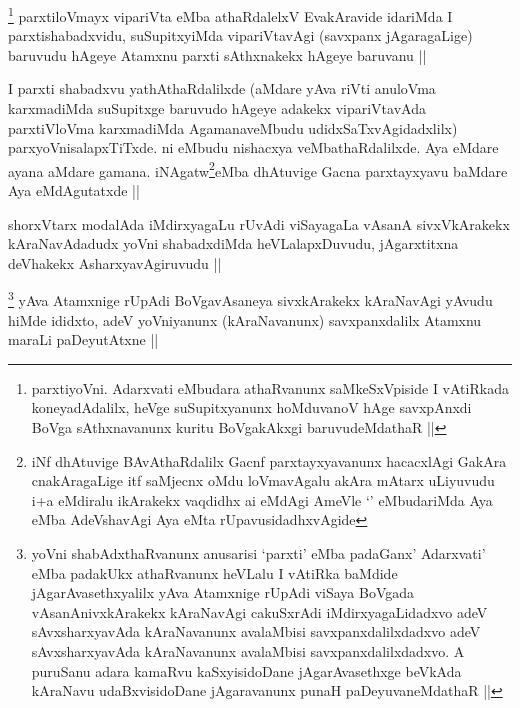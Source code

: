 
\begin{artha}
\footnote{parxtiyoVni. Adarxvati eMbudara athaRvanunx saMkeSxVpiside I vAtiRkada koneyadAdalilx, heVge suSupitxyanunx hoMduvanoV hAge savxpAnxdi BoVga sAthxnavanunx kuritu BoVgakAkxgi baruvudeMdathaR ||}
parxtiloVmayx vipariVta eMba athaRdalelxV EvakAravide idariMda I parxtishabadxvidu, suSupitxyiMda vipariVtavAgi (savxpanx jAgaragaLige) baruvudu hAgeye Atamxnu parxti sAthxnakekx hAgeye baruvanu ||
\end{artha}


\begin{artha}
I parxti shabadxvu yathAthaRdalilxde (aMdare yAva riVti anuloVma karxmadiMda suSupitxge baruvudo hAgeye adakekx vipariVtavAda parxtiVloVma karxmadiMda AgamanaveMbudu udidxSaTxvAgidadxlilx) parxyoVnisalapxTiTxde. ni eMbudu nishacxya veMbathaRdalilxde. Aya eMdare ayana aMdare gamana. iNAgatw\footnote{iNf dhAtuvige BAvAthaRdalilx Gacnf parxtayxyavanunx hacacxlAgi GakAra cnakAragaLige itf saMjecnx oMdu loVmavAgalu akAra mAtarx uLiyuvudu i+a eMdiralu ikArakekx vaqdidhx ai eMdAgi AmeVle `\stext' eMbudariMda Aya eMba AdeVshavAgi Aya eMta rUpavusidadhxvAgide}eMba dhAtuvige Gacna parxtayxyavu baMdare Aya eMdAgutatxde ||
\end{artha}


\begin{artha}
shorxVtarx modalAda iMdirxyagaLu rUvAdi viSayagaLa vAsanA sivxVkArakekx kAraNavAdadudx yoVni shabadxdiMda heVLalapxDuvudu, jAgarxtitxna deVhakekx AsharxyavAgiruvudu ||
\end{artha}

\begin{artha}
\footnote{yoVni shabAdxthaRvanunx anusarisi `parxti' eMba padaGanx' Adarxvati' eMba padakUkx athaRvanunx heVLalu I vAtiRka baMdide jAgarAvasethxyalilx yAva Atamxnige rUpAdi viSaya BoVgada vAsanAnivxkArakekx kAraNavAgi cakuSxrAdi iMdirxyagaLidadxvo adeV sAvxsharxyavAda kAraNavanunx avalaMbisi savxpanxdalilxdadxvo adeV sAvxsharxyavAda kAraNavanunx avalaMbisi savxpanxdalilxdadxvo. A puruSanu adara kamaRvu kaSxyisidoDane jAgarAvasethxge beVkAda kAraNavu udaBxvisidoDane jAgaravanunx punaH paDeyuvaneMdathaR ||}
yAva Atamxnige rUpAdi BoVgavAsaneya sivxkArakekx kAraNavAgi yAvudu hiMde ididxto, adeV yoVniyanunx (kAraNavanunx) savxpanxdalilx Atamxnu maraLi paDeyutAtxne ||
\end{artha}

